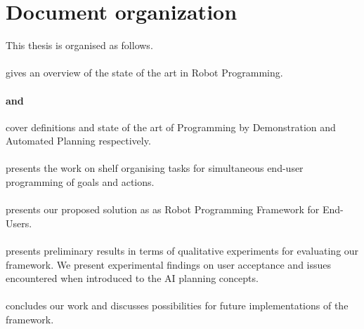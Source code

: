 \section{Document organization}
This thesis is organised as follows. 

\paragraph{} gives an overview of the state of the art in Robot Programming.

\paragraph{ and } cover definitions and state of the art of Programming by Demonstration and Automated Planning respectively.

\paragraph{} presents the work on shelf organising tasks for simultaneous end-user programming of goals and actions.

\paragraph{} presents our proposed solution as as Robot Programming Framework for End-Users.


\paragraph{} presents preliminary results in terms of qualitative experiments for evaluating our framework. We present experimental findings on user acceptance and issues encountered when introduced to the AI planning concepts.

\paragraph{} concludes our work and discusses possibilities for future implementations of the framework.
